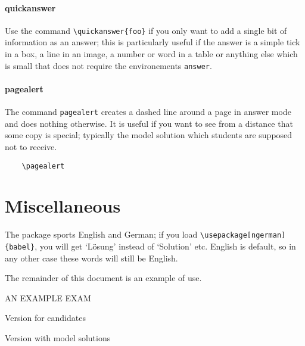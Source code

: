 \documentclass[a4paper]{scrartcl}
\begin{document}
\paragraph{quickanswer}

Use the command \verb|\quickanswer{foo}| if you only want to add a  single bit of information as an answer; this is particularly useful if the answer is a simple tick in a box, a line in an image, a number or word in a table or anything else which is small that does not require the environements \verb|answer|. 



\paragraph{pagealert}
The command \verb|pagealert| creates a dashed line around a page in answer mode and does nothing otherwise. It is useful if you want to see from a distance that some copy is special; typically the model solution which students are supposed not to receive.  

\begin{verbatim}
    \pagealert
\end{verbatim}


\section*{Miscellaneous}

The package sports English and German; if you load \verb|\usepackage[ngerman]{babel}|, you will get `Lösung' instead of `Solution' etc. English is default, so in any other case these words will still be English. 

The remainder of this document is an example of use.


\newpage
\sffamily

\begin{center}
{\LARGE AN EXAMPLE EXAM}
\pagealert
\vspace{3ex}

\begin{hide}
    Version for candidates
\end{hide}

\begin{answer-}
    Version with model solutions
\end{answer-}

 
\end{center}
\end{document}
